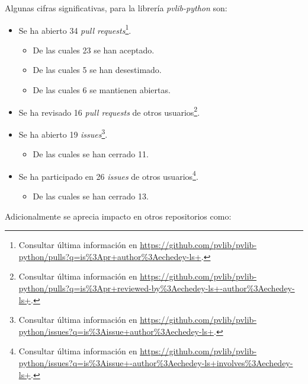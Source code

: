 Algunas cifras significativas, para la librería \textit{pvlib-python} son:

\begin{itemize}
    \item Se ha abierto 34 \textit{pull requests}\footnote{Consultar última información en \url{https://github.com/pvlib/pvlib-python/pulls?q=is\%3Apr+author\%3Aechedey-ls+}.}.
    \begin{itemize}
        \item De las cuales 23 se han aceptado.
        \item De las cuales 5 se han desestimado.
        \item De las cuales 6 se mantienen abiertas.
    \end{itemize}
    \item Se ha revisado 16 \textit{pull requests} de otros usuarios\footnote{Consultar última información en \url{https://github.com/pvlib/pvlib-python/pulls?q=is\%3Apr+reviewed-by\%3Aechedey-ls+-author\%3Aechedey-ls+}.}.
    \item Se ha abierto 19 \textit{issues}\footnote{Consultar última información en \url{https://github.com/pvlib/pvlib-python/issues?q=is\%3Aissue+author\%3Aechedey-ls+}.}.
    \begin{itemize}
        \item De las cuales se han cerrado 11.
    \end{itemize}
    \item Se ha participado en 26 \textit{issues} de otros usuarios\footnote{Consultar última información en \url{https://github.com/pvlib/pvlib-python/issues?q=is\%3Aissue+-author\%3Aechedey-ls+involves\%3Aechedey-ls+}.}.
    \begin{itemize}
        \item De las cuales se han cerrado 13.
    \end{itemize}
\end{itemize}

Adicionalmente se aprecia impacto en otros repositorios como:

